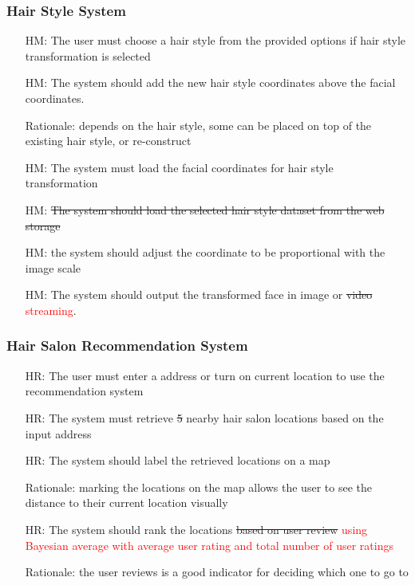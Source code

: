 \documentclass[12pt]{article}
\newcounter{reqnum} %
\newcounter{hmreqnum} %
\newcounter{hrreqnum} %
\begin{document}
\subsubsection{Hair Style System}
    \begin{itemize}
        \item[HM\refstepcounter{hmreqnum}\thehmreqnum \label{R_Inputs}:]The user must choose a hair style from the provided options if hair style transformation is selected
        \item[HM\refstepcounter{hmreqnum}\thehmreqnum \label{R_Inputs}:] The system should add the new hair style coordinates above the facial coordinates.
        \item[] Rationale: depends on the hair style, some can be placed on top of the existing hair style, or re-construct
        \item[HM\refstepcounter{hmreqnum}\thehmreqnum \label{R_Inputs}:] The system must load the facial coordinates for hair style transformation
        \item[HM\refstepcounter{hmreqnum}\thehmreqnum \label{R_Inputs}:]\sout{ The system should load the selected hair style dataset from the web storage}
        \item[HM\refstepcounter{hmreqnum}\thehmreqnum \label{R_Inputs}:] the system should adjust the coordinate to be proportional with the image scale
        \item[HM\refstepcounter{hmreqnum}\thehmreqnum \label{R_Inputs}:] The system should output the transformed face in image or \sout{video} \textcolor{red}{streaming}.
    \end{itemize}
\subsubsection{Hair Salon Recommendation System}
    \begin{itemize}
        \item[HR\refstepcounter{hrreqnum}\thehrreqnum \label{R_Inputs}:] The user must enter a address or turn on current location to use the recommendation system
        \item[HR\refstepcounter{hrreqnum}\thehrreqnum \label{R_Inputs}:] The system must retrieve \sout{5} nearby hair salon locations based on the input address
        \item[HR\refstepcounter{hrreqnum}\thehrreqnum \label{R_Inputs}:] The system should label the retrieved locations on a map
        \item[] Rationale: marking the locations on the map allows the user to see the distance to their current location visually
        \item[HR\refstepcounter{hrreqnum}\thehrreqnum \label{R_Inputs}:] The system should rank the locations \sout{based on user review} \textcolor{red}{using Bayesian average with average user rating and total number of user ratings}
        \item[] Rationale: the user reviews is a good indicator for deciding which one to go to
    \end{itemize}
    
\end{document}
